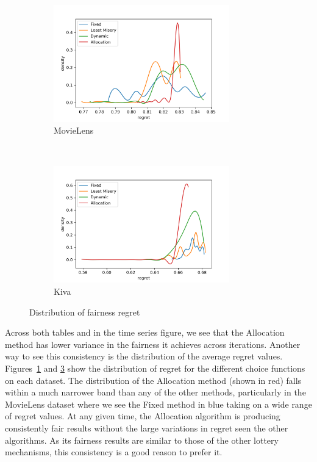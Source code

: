 \begin{figure}[t!]
    \centering
    \begin{subfigure}[t]{0.4\textwidth}
        \centering
        \includegraphics[width=3.0in]{imgs/dynfair/ML_regret_variance_sep20.png}
        \caption{MovieLens}
        \label{fig:local-regret-ML}
    \end{subfigure}%
    ~ 
    \begin{subfigure}[t]{0.5\textwidth}
        \centering
        \includegraphics[width=3.0in]{imgs/dynfair/kiva_regret_variance_sep20.png}
        \caption{Kiva}
        \label{fig:local-regret-Kiva}
    \end{subfigure}
    \caption{Distribution of fairness regret}
\end{figure}

Across both tables and in the time series figure, we see that the Allocation method has lower variance in the fairness it achieves across iterations. Another way to see this consistency is the distribution of the average regret values. Figures~\ref{fig:local-regret-ML} and \ref{fig:local-regret-Kiva} show the distribution of regret for the different choice functions on each dataset. The distribution of the Allocation method (shown in red) falls within a much narrower band than any of the other methods, particularly in the MovieLens dataset where we see the Fixed method in blue taking on a wide range of regret values. At any given time, the Allocation algorithm is producing consistently fair results without the large variations in regret seen the other algorithms. As its fairness results are similar to those of the other lottery mechanisms, this consistency is a good reason to prefer it.

